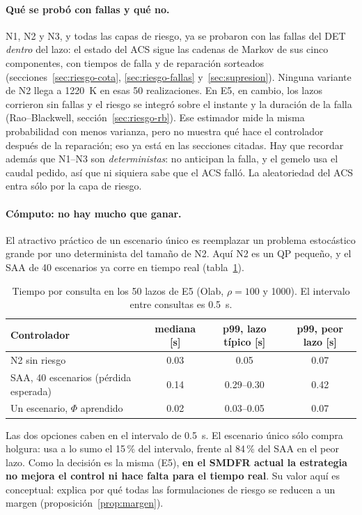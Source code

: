 \paragraph{Qué se probó con fallas y qué no.} N1, N2 y N3, y todas las capas de riesgo, ya se
probaron con las fallas del DET \emph{dentro} del lazo: el estado del ACS sigue las cadenas de
Markov de sus cinco componentes, con tiempos de falla y de reparación sorteados
(secciones~\ref{sec:riesgo-cota}, \ref{sec:riesgo-fallas} y~\ref{sec:supresion}). Ninguna
variante de N2 llega a 1220~K en esas 50 realizaciones. En E5, en cambio, los lazos corrieron sin
fallas y el riesgo se integró sobre el instante y la duración de la falla (Rao--Blackwell,
sección~\ref{sec:riesgo-rb}). Ese estimador mide la misma probabilidad con menos varianza, pero
no muestra qué hace el controlador después de la reparación; eso ya está en las secciones
citadas. Hay que recordar además que N1--N3 son \emph{deterministas}: no anticipan la falla, y el
gemelo usa el caudal pedido, así que ni siquiera sabe que el ACS falló. La aleatoriedad del ACS
entra sólo por la capa de riesgo.

\paragraph{Cómputo: no hay mucho que ganar.} El atractivo práctico de un escenario único es
reemplazar un problema estocástico grande por uno determinista del tamaño de N2. Aquí N2 es un QP
pequeño, y el SAA de 40 escenarios ya corre en tiempo real (tabla~\ref{tab:f9-cpu}).

\begin{table}[H]\centering\footnotesize
\caption{Tiempo por consulta en los 50 lazos de E5 (Olab, $\rho=100$ y 1000). El intervalo entre
consultas es 0.5~s.}
\label{tab:f9-cpu}
\begin{tabular}{@{}lccc@{}}
\toprule
Controlador & mediana [s] & p99, lazo típico [s] & p99, peor lazo [s]\\
\midrule
N2 sin riesgo & 0.03 & 0.05 & 0.07\\
SAA, 40 escenarios (pérdida esperada) & 0.14 & 0.29--0.30 & 0.42\\
Un escenario, $\Phi$ aprendido & 0.02 & 0.03--0.05 & 0.07\\
\bottomrule
\end{tabular}
\end{table}

\noindent Las dos opciones caben en el intervalo de 0.5~s. El escenario único sólo compra
holgura: usa a lo sumo el 15\,\% del intervalo, frente al 84\,\% del SAA en el peor lazo. Como
la decisión es la misma (E5), \textbf{en el SMDFR actual la estrategia no mejora el control ni
hace falta para el tiempo real}. Su valor aquí es conceptual: explica por qué todas las
formulaciones de riesgo se reducen a un margen (proposición~\ref{prop:margen}).

